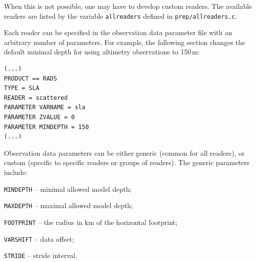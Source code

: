 \documentclass[11pt]{report}
\begin{document}
When this is not possible, one may have to develop custom readers.
The available readers are listed by the variable \verb|allreaders| defined in \verb|prep/allreaders.c|.

Each reader can be specified in the observation data parameter file with an arbitrary number of parameters.
For example, the following section changes the default minimal depth for using altimetry observations to 150\,m:
\begin{Verbatim}
(...)
PRODUCT == RADS
TYPE = SLA
READER = scattered
PARAMETER VARNAME = sla
PARAMETER ZVALUE = 0
PARAMETER MINDEPTH = 150
(...)
\end{Verbatim}

Observation data parameters can be either generic (common for all readers), or custom (specific to specific readers or groups of readers).
The generic parameters include:
\begin{description}
\item{\verb|MINDEPTH|} -- minimal allowed model depth;
\item{\verb|MAXDEPTH|} -- maximal allowed model depth;
\item{\verb|FOOTPRINT|} -- the radius in km of the horizontal footprint;
\item{\verb|VARSHIFT|} -- data offset;
\item{\verb|STRIDE|} -- stride interval.
\end{description}
\end{document}

